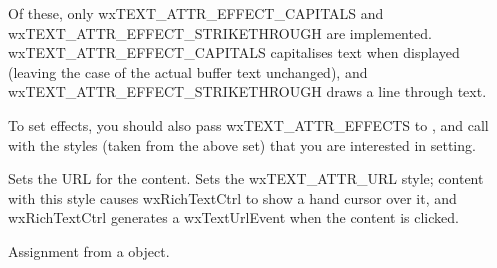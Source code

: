 Of these, only wxTEXT\_ATTR\_EFFECT\_CAPITALS and wxTEXT\_ATTR\_EFFECT\_STRIKETHROUGH are implemented.
wxTEXT\_ATTR\_EFFECT\_CAPITALS capitalises text when displayed (leaving the case of the actual buffer
text unchanged), and wxTEXT\_ATTR\_EFFECT\_STRIKETHROUGH draws a line through text.

To set effects, you should also pass wxTEXT\_ATTR\_EFFECTS to , and call\rtfsp
{} with the styles (taken from the
above set) that you are interested in setting.

\label{wxtextattrseturl}


Sets the URL for the content. Sets the wxTEXT\_ATTR\_URL style; content with this style
causes wxRichTextCtrl to show a hand cursor over it, and wxRichTextCtrl generates
a wxTextUrlEvent when the content is clicked.

\label{wxtextattroperatorassign}


Assignment from a  object.

